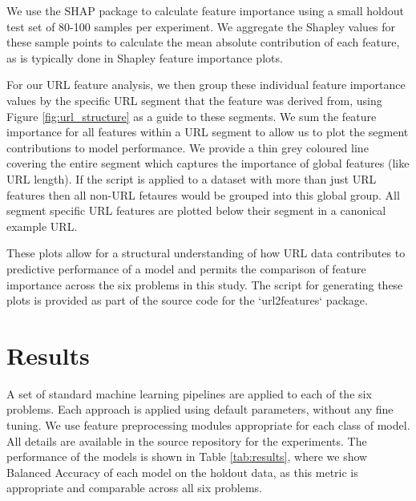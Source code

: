 \documentclass{aircc}
\begin{document}
We use the SHAP\cite{Lundberg2017} package to calculate feature importance using a 
small holdout test set of 80-100 samples per experiment. 
We aggregate the Shapley values for these sample points to calculate the mean
absolute contribution of each feature, as is typically done in Shapley feature 
importance plots.

For our URL feature analysis, we then group these individual feature importance 
values by the specific URL segment that the feature was derived from, 
using Figure \ref{fig:url_structure} as a guide to these segments. 
We sum the feature importance for all features within a URL segment to allow us to plot the
segment contributions to model performance. We provide a thin grey coloured line 
covering the entire segment
which captures the importance of global features (like URL length). 
If the script is applied to a dataset with
more than just URL features then all non-URL fetaures would be grouped into this global group. All segment specific
URL features are plotted below their segment in a canonical example URL.

These plots allow for a structural understanding of how URL data
contributes to predictive performance of a model and permits the comparison of 
feature importance 
across the six problems in this study. 
The script for generating these plots is provided as part 
of the source code for the `url2features` package.

\section{Results}

A set of standard machine learning pipelines are applied to each of the six 
problems. Each approach is applied using default parameters, without any fine tuning. 
We use feature preprocessing modules appropriate for each class
of model. All details are available in the source repository for the experiments. 
The performance of the models is shown in Table \ref{tab:results}, where we show 
Balanced Accuracy of each model on the holdout data, as this
metric is appropriate and comparable across all six problems. 

\begin{table}
\caption{Machine Learning Results}
\fontsize{3pt}{3pt}\selectfont
\label{tab:results}
\end{table}
\end{document}

